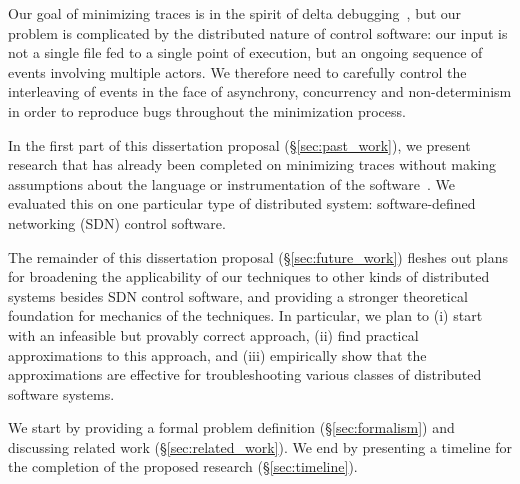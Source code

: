 Our goal of minimizing traces is in the spirit of
delta debugging~\cite{Zeller:1999:YMP:318773.318946}, but our problem is
complicated by the distributed nature of control software:
our input is not a single file fed to a single point of execution, but an ongoing
sequence of events involving
multiple actors. We therefore need to carefully
control the interleaving of events in the face of asynchrony, concurrency and non-determinism in
order to reproduce bugs throughout the minimization process.

In the first part of this dissertation proposal (\S\ref{sec:past_work}), we present research that has
already been completed on minimizing traces without making assumptions about the language
or instrumentation of the software~\cite{sts2014}. We evaluated this on one
particular type of distributed system: software-defined networking
(SDN) control software.


The remainder of this dissertation proposal (\S\ref{sec:future_work}) fleshes out plans for
broadening the applicability of our techniques to other kinds of distributed systems besides SDN control
software, and providing a stronger theoretical foundation for mechanics of the techniques.
In particular, we plan to (i) start with an infeasible but provably correct approach,
(ii) find practical approximations to this approach, and (iii) empirically show that the approximations are effective for
troubleshooting various classes of distributed software systems.

We start by providing a formal problem definition (\S\ref{sec:formalism}) and
discussing related work (\S\ref{sec:related_work}). We end by
presenting a timeline for the completion of the proposed research (\S\ref{sec:timeline}).
